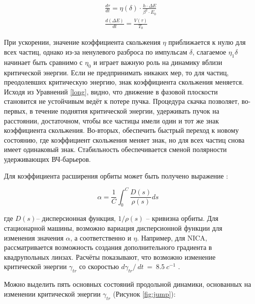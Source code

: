 \documentclass[a4paper]{panl}
\begin{document}
\begin{equation}
\begin{aligned}
& \frac{d \tau}{d t}=\eta(\delta) \cdot \frac{h \cdot \Delta E}{\beta^2 \cdot E_0} \\
& \frac{d(\Delta E)}{d t}=\frac{V(\tau)}{T_0}
\end{aligned}
\label{long}
\end{equation}

\par При ускорении, значение коэффициента скольжения $\eta$ приближается к нулю для всех частиц, однако из-за ненулевого разброса по импульсам $\delta$, слагаемое $\eta_1\delta$ начинает быть сравнимо с $\eta_0$ и играет важную роль на динамику вблизи критической энергии. Если не предпринимать никаких мер, то для частиц, преодолевших критическую энергию, знак ко\-эф\-фи\-ци\-ента скольжения меняется. Исходя из Уравнений \ref{long}, видно, что движение в фазовой плоскости становится не устойчивым ведёт к потере пучка. Процедура скачка позволяет, во-первых, в течение поднятия критической энергии, удерживать пучок на расстоянии, достаточном, чтобы все час\-ти\-цы имели один и тот же знак коэффициента скольжения. Во-вторых, о\-бес\-пе\-чить быстрый переход к новому состоянию, где ко\-эф\-фи\-ци\-ент сколь\-же\-ния меняет знак, но для всех частиц снова имеет одинаковый знак. Стабильность обеспечивается сменой полярности у\-дер\-жи\-ва\-ющ\-их ВЧ-барьеров.

 Для коэффициента расширения орбиты может быть получено вы\-ра\-же\-ние \cite{resonant}:
 
\begin{equation}
\alpha=\frac{1}{C}\int_{0}^{C}{\frac{D\left(s\right)}{\rho\left(s\right)}ds}
\label{alpha_c}
\end{equation}

где $D\left(s\right)$– дисперсионная функция, $1/\rho\left(s\right)$ – кривизна орбиты. Для стационарной машины, возможно вариация дисперсионной функции для изменения значения $\alpha$, а соответственно и $\eta$. Например, для NICA, рассматривается возможность создания дополнительного градиента в квадрупольных линзах. Расчёты показывают, что возможно изменение критической энергии $\gamma_{tr}$ со скоростью $d\gamma_{tr}/\ dt\ =\ 8.5\ c^{-1}$ \cite{syresin}.

Можно выделить пять основных состояний продольной динамики, основанных на изменении критической энергии 
$\gamma_{tr}$ (Рисунок \ref{fig:jump}):
\end{document}
